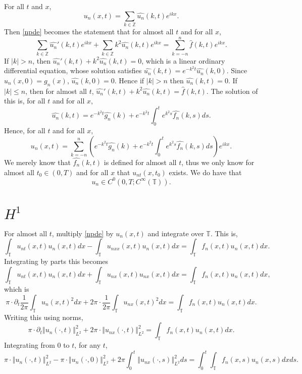 \documentclass{article}
\newcommand{\norm}[1]{\left\Vert #1 \right\Vert}
\begin{document}
For all $t$ and $x$,
\[
u_n(x,t)=\sum_{k \in \mathbb{Z}} \widehat{u_n}(k,t) e^{ikx}.
\]
Then \eqref{npde} becomes the statement that for almost all $t$ and for all $x$,
\[
\sum_{k \in \mathbb{Z}} \widehat{u_n}'(k,t) e^{ikx} + \sum_{k \in \mathbb{Z}} k^2 \widehat{u_n}(k,t) e^{ikx}
=\sum_{k=-n}^n \hat{f}(k,t) e^{ikx}.
\]
If $|k| >n$, then $\widehat{u_n}'(k,t) + k^2 \widehat{u_n}(k,t) = 0$, which  is a linear ordinary differential equation,  whose
solution satisfies $\widehat{u_n}(k,t)=e^{-k^2 t} \widehat{u_n}(k,0)$. Since $u_n(x,0)=g_n(x)$, $\widehat{u_n}(k,0)=0$. Hence
if $|k|>n$ then $\widehat{u_n}(k,t)=0$. If $|k| \leq n$, then for almost all $t$, $\widehat{u_n}'(k,t) + k^2 \widehat{u_n}(k,t) = \hat{f}(k,t)$.
The solution of this is, for all $t$ and for all $x$,
\[
\widehat{u_n}(k,t)=e^{-k^2 t} \widehat{g_n}(k) + e^{-k^2 t}  \int_0^t e^{k^2 s} \widehat{f_n}(k,s) ds.
\]
Hence, for  all $t$ and for all $x$,
\[
u_n(x,t)=\sum_{k=-n}^n \left(e^{-k^2 t} \widehat{g_n}(k) + e^{-k^2 t}  \int_0^t e^{k^2 s} \widehat{f_n}(k,s) ds\right) e^{ikx}.
\]
We merely know
that $\widehat{f_n}(k,t)$ is defined for almost all $t$, thus we only know 
for almost all $t_0 \in (0,T)$ and for all $x$ that $u_{nt}(x,t_0)$ exists. We do have that 
\[
u_n \in C^0(0,T;C^\infty(\mathbb{T})).
\]

\section{$H^1$}
For almost all $t$, multiply \eqref{npde} by $u_n(x,t)$ and integrate over $\mathbb{T}$. This is,
\[
\int_\mathbb{T} u_{nt}(x,t)u_n(x,t) dx- \int_\mathbb{T} u_{nxx}(x,t) u_n(x,t) dx = \int_\mathbb{T} f_n(x,t) u_n(x,t) dx.
\]
Integrating by parts this becomes
\[
\int_\mathbb{T} u_{nt}(x,t) u_n(x,t) dx + \int_\mathbb{T} u_{nx}(x,t) u_{nx}(x,t) dx = \int_\mathbb{T} f_n(x,t) u_n(x,t) dx,
\]
which is
\[
\pi \cdot \partial_t \frac{1}{2\pi} \int_\mathbb{T} u_n(x,t)^2 dx + 2\pi \cdot \frac{1}{2\pi} \int_\mathbb{T} u_{nx}(x,t)^2 dx = \int_\mathbb{T} f_n(x,t) u_n(x,t) dx.
\]
Writing this using norms,
\[
\pi \cdot \partial_t \norm{u_n(\cdot,t)}_{L^2}^2 + 2\pi \cdot \norm{u_{nx}(\cdot,t)}_{L^2}^2 =  \int_\mathbb{T} f_n(x,t) u_n(x,t) dx.
\]
Integrating from $0$ to $t$, for any $t$,
\[
\pi \cdot \norm{u_n(\cdot,t)}_{L^2}^2 - \pi \cdot \norm{u_n(\cdot,0)}_{L^2}^2
+ 2\pi \int_0^t \norm{u_{nx}(\cdot,s)}_{L^2}^2 ds = \int_0^t  \int_\mathbb{T} f_n(x,s) u_n(x,s) dx ds.
\]
\end{document}
